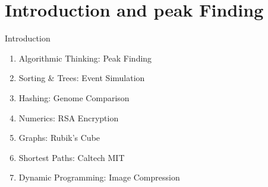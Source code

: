 
\section{Introduction and peak Finding}
Introduction
\begin{enumerate}
    \item Algorithmic Thinking: Peak Finding
    \item Sorting \& Trees: Event Simulation
    \item Hashing: Genome Comparison
    \item Numerics: RSA Encryption
    \item Graphs: Rubik’s Cube
    \item Shortest Paths: Caltech \textrightarrow MIT
    \item Dynamic Programming: Image Compression
\end{enumerate}
